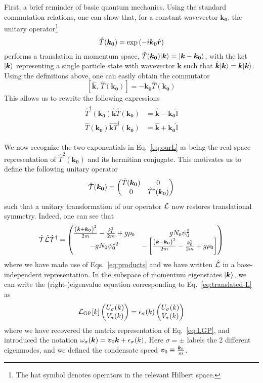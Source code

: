 First, a brief reminder of basic quantum mechanics. Using the standard
commutation relations, one can show that, for a constant wavevector
$\bm{k_0}$, the unitary operator\footnote{The hat symbol denotes
  operators in the relevant Hilbert space.}
%
\begin{equation}\label{eq:trans-oper}
  \hat{T}(\bm{k_0}) = \exp \left( -i \bm{k_0} \hat{\bm{r}} \right)
\end{equation}
% 
performs a translation in momentum space,
$\hat{T}(\bm{k_0}) \vert \bm{k} \rangle = \vert \bm{k} - \bm{k_0} \rangle$, with the
ket $\vert \bm{k} \rangle$ representing a single particle state with
wavevector $\bm{k}$ such that
$\hat{\bm{k}} \vert \bm{k} \rangle = \bm{k} \vert \bm{k} \rangle$. Using the
definitions above, one can easily obtain the commutator
%
\begin{equation}\label{eq:trans-commutator}
  \left[ \hat{\bm{k}},\, \hat{T}(\bm{k_0}) \right] = -\bm{k_0}\hat{T}(\bm{k_0}) 
\end{equation}
% 
This allows us to rewrite the following expressions
\begin{align}\label{eq:products}
  \begin{split}
    \hat{T}^{\dagger}(\bm{k_0})\hat{\bm{k}}\hat{T}(\bm{k_0})& = \hat{\bm{k}} - \bm{k_0}\hat{\mathbb{I}}\\
    \hat{T}(\bm{k_0})\hat{\bm{k}}\hat{T}^{\dagger}(\bm{k_0})& = \hat{\bm{k}} + \bm{k_0}\hat{\mathbb{I}}  
  \end{split}
\end{align}

We now recognize the two exponentials in Eq.~\eqref{eq:ourL} as being
the real-space representation of $\hat{T}^2(\bm{k_0})$ and its
hermitian conjugate. This motivates us to define the following unitary
operator
%
\begin{equation}\label{eq:ucal}
  \hat{\mathcal{T}}(\bm{k_0}) = \begin{pmatrix} \hat{T}(\bm{k_0}) & 0\\ 0 & \hat{T}^{\dagger}(\bm{k_0}) \end{pmatrix}
\end{equation}
% 
such that a unitary transformation of our operator $\mathcal{L}$ now restores translational
symmetry. Indeed, one can see that
%
\begin{equation}\label{eq:translated-L}
  \hat{\mathcal{T}} \hat{\mathcal{L}} \hat{\mathcal{T}}^{\dagger} = \begin{pmatrix} \frac{\left(\hat{\bm{k}} + \bm{k_0}\right)^2}{2m} - \frac{k_0^2}{2m} + g\rho_0 & g N_0 \psi_0^2\\ - g N_0 \psi_0^{\star 2} & -\left[\frac{\left(\hat{\bm{k}} - \bm{k_0}\right)^2}{2m} - \frac{k_0^2}{2m} + g\rho_0 \right] \end{pmatrix}
\end{equation}
% 
where we have made use of Eqs.~\eqref{eq:products} and we have written
$\hat{\mathcal{L}}$ in a base-independent representation.  In the subspace of
momentum eigenstates $\vert \bm{k} \rangle$, we can write the (right-)eigenvalue
equation corresponding to Eq.~\eqref{eq:translated-L} as
%
\begin{equation}\label{eq:right-eigen}
  \mathcal{L}_{\text{GP}} [k] \begin{pmatrix} U_\sigma(k)\\ V_\sigma(k) \end{pmatrix} = \epsilon_\sigma(k) \begin{pmatrix} U_\sigma(k)\\ V_\sigma(k) \end{pmatrix}
\end{equation}
% 
where we have recovered the matrix representation of
Eq.~\eqref{eq:LGP}, and introduced the notation
$\omega_\sigma(\bm{k}) = \bm{v}_0 \bm{k} + \epsilon_\sigma(k)$. Here
$\sigma = \pm$ labels the 2 different eigenmodes, and we defined the
condensate speed $\bm{v}_0 \equiv \frac{\bm{k}_0}{m}$.

